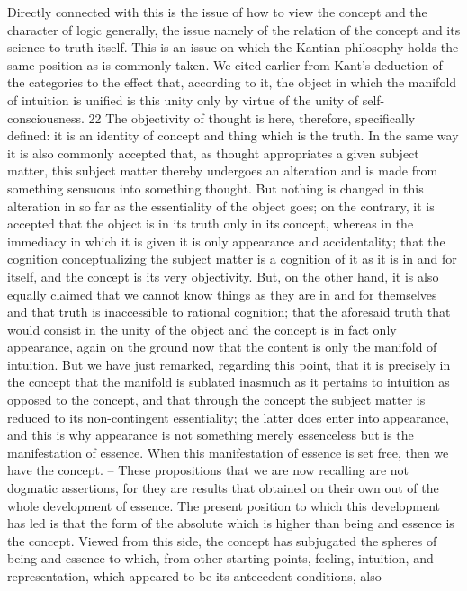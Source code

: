 Directly connected with this is the issue of how to view the concept
and the character of logic generally, the issue namely of the relation of
the concept and its science to truth itself. This is an issue on which the
Kantian philosophy holds the same position as is commonly taken. We
cited earlier from Kant's deduction of the categories to the effect that,
according to it, the object in which the manifold of intuition is unified is
this unity only by virtue of the unity of self-consciousness. 22 The objectivity of
thought is here, therefore, specifically defined: it is an identity of concept
and thing which is the truth. In the same way it is also commonly accepted
that, as thought appropriates a given subject matter, this subject matter
thereby undergoes an alteration and is made from something sensuous
into something thought. But nothing is changed in this alteration in so
far as the essentiality of the object goes; on the contrary, it is accepted that
the object is in its truth only in its concept, whereas in the immediacy in
which it is given it is only appearance and accidentality; that the cognition
conceptualizing the subject matter is a cognition of it as it is in and for itself,
and the concept is its very objectivity. But, on the other hand, it is also
equally claimed that we cannot know things as they are in and for themselves
and that truth is inaccessible to rational cognition; that the aforesaid truth
that would consist in the unity of the object and the concept is in fact
only appearance, again on the ground now that the content is only the
manifold of intuition. But we have just remarked, regarding this point,
that it is precisely in the concept that the manifold is sublated inasmuch
as it pertains to intuition as opposed to the concept, and that through the
concept the subject matter is reduced to its non-contingent essentiality;
the latter does enter into appearance, and this is why appearance is not
something merely essenceless but is the manifestation of essence. When
this manifestation of essence is set free, then we have the concept. – These
propositions that we are now recalling are not dogmatic assertions, for
they are results that obtained on their own out of the whole development
of essence. The present position to which this development has led is that
the form of the absolute which is higher than being and essence is the
concept. Viewed from this side, the concept has subjugated the spheres of
being and essence to which, from other starting points, feeling, intuition,
and representation, which appeared to be its antecedent conditions, also
